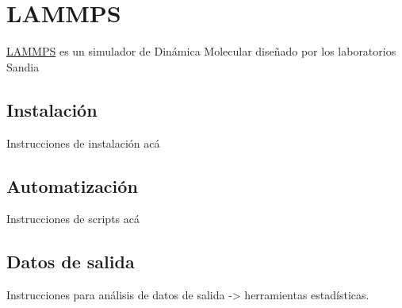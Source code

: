 
\chapter{LAMMPS} %

\label{AA} %


\href{lammps.sandia.gov}{LAMMPS} es un simulador de Dinámica Molecular diseñado por los laboratorios Sandia

\section{Instalación}
\label{AA_1}

Instrucciones de instalación acá

\section{Automatización}
\label{AA_2}

Instrucciones de scripts acá

\section{Datos de salida}
\label{AA_3}

Instrucciones para análisis de datos de salida -> herramientas estadísticas.
